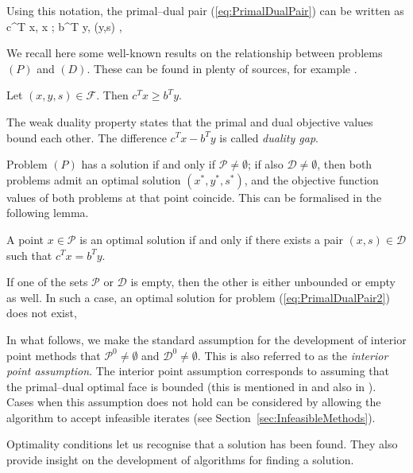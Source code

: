 Using this notation, the primal--dual pair (\ref{eq:PrimalDualPair}) can 
be written as
\be \label{eq:PrimalDualPair2}
\min \; c^T x, \;\;  x    \in {}; \qquad
\max \; b^T y, \;\; (y,s) \in {},
\ee

We recall here some well-known results on the relationship between
problems $(P)$ and $(D)$.
These can be found in plenty of sources, for example 
\cite{lp:Chvatal,Schrijver86}.

\begin{lemma}
Let $(x,y,s) \in \mathcal{F}$. Then $c^Tx \ge b^Ty$.
\end{lemma}

The weak duality property states that the primal and dual objective
values bound each other.
The difference $c^Tx - b^Ty$ is called {\em duality gap}.

Problem $(P)$ has a solution if and only if $\mathcal{P} \ne \emptyset$;
if also $\mathcal{D} \ne \emptyset$, then both problems admit an
optimal solution $(x^*, y^*, s^*)$, and the objective function 
values of both problems at that point coincide. This can be formalised
in the following lemma.

\begin{lemma}
A point $x \in \mathcal{P}$ is an optimal solution if and only if
there exists a pair $(x,s) \in \mathcal{D}$ such that $c^Tx = b^Ty$.
\end{lemma}

If one of the sets $\mathcal{P}$ or $\mathcal{D}$ is empty, 
then the other is either unbounded or empty as well. 
In such a case, an optimal
solution for problem (\ref{eq:PrimalDualPair2}) does not exist,

In what follows, we make the standard assumption for the development
of interior point methods that $\mathcal{P}^0 \ne \emptyset$ and 
$\mathcal{D}^0 \ne \emptyset$. This is also referred to as the
{\em interior point assumption}. 
The interior point assumption corresponds to assuming that 
the primal--dual optimal face is 
bounded (this is mentioned in \cite{GonzagaCardia04} and also
in \cite[Lemma~2.2]{GulerRoosTerlakyVial}).
Cases when this assumption does not hold can be considered by allowing
the algorithm to accept infeasible iterates 
(see Section~\ref{sec:InfeasibleMethods}).


Optimality conditions let us recognise that a solution has been
found. They also provide insight on the development of algorithms 
for finding a solution.

